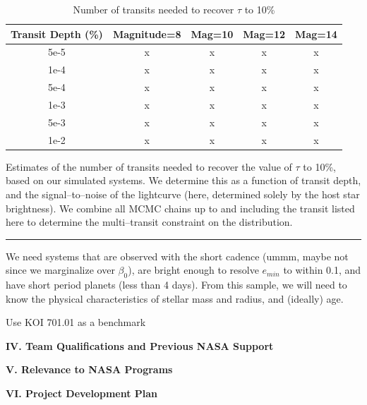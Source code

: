 \begin{table}[t]
\begin{center}
\caption{\label{tab-taurun} Number of transits needed to recover $\tau$ to 10\%}
\begin{tabular}{c|cccc}
\hline \hline
Transit Depth (\%) & Magnitude=8 & Mag=10 & Mag=12 & Mag=14\\
\hline
5e-5 & x & x & x & x \\
1e-4 & x & x & x & x \\
5e-4 & x & x & x & x \\
1e-3 & x & x & x & x \\
5e-3 & x & x & x & x \\
1e-2 & x & x & x & x \\
\hline
\end{tabular}
\end{center}
Estimates of the number of transits needed to recover the value of
$\tau$ to 10\%, based on our simulated systems.  We determine this as
a function of transit depth, and the signal--to--noise of the
lightcurve (here, determined solely by the host star brightness).  We
combine all MCMC chains up to and including the transit listed here to
determine the multi--transit constraint on the distribution.
\hspace*{\fill} \\
\hrule
\end{table}

\medskip
{\centerline{}}
\smallskip

We need systems that are observed with the short cadence (ummm, maybe
not since we marginalize over $\beta_0$), are bright enough to resolve
$e_{min}$ to within 0.1, and have short period planets (less than 4
days).  From this sample, we will need to know the physical
characteristics of stellar mass and radius, and (ideally) age.

\medskip
{\centerline{}}
\smallskip

Use KOI 701.01 as a benchmark

\bigskip
\centerline{\bf IV. Team Qualifications and Previous NASA Support}
\smallskip

\bigskip
\centerline{\bf V. Relevance to NASA Programs}
\smallskip

\bigskip
\centerline{\bf VI. Project Development Plan}
\smallskip

